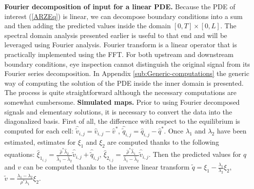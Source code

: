 \documentclass[preprint]{elsarticle}
\begin{document}
\textbf{Fourier decomposition of input for a linear PDE. } Because the PDE of interest (\eqref{ARZEq}) is linear, we can decompose boundary conditions into a sum and then adding
the predicted values inside the domain $\left[0,T\right]\times\left[0,L\right]$. The spectral domain analysis presented
earlier is useful to that end and will be leveraged using Fourier
analysis. Fourier transform is a linear operator that is practically
implemented using the FFT.
For both upstream and downstream boundary conditions,
eye inspection cannot distinguish the original signal from its Fourier
series decomposition. In Appendix \ref{sub:Generic-computations}
the generic way of computing the solution of the PDE inside the inner
domain is presented. The process is quite straightforward although
the necessary computations are somewhat cumbersome. \textbf{Simulated maps.} Prior to using Fourier decomposed signals and elementary solutions,
it is necessary to convert the data into the diagonalized basis. First
of all, the difference with respect to the equilibrium is computed
for each cell: $\widehat{\widetilde{v}}_{i,j}=\widehat{v}_{i,j}-\widehat{v}^{*}$,
$\widehat{\widetilde{q}}_{i,j}=\widehat{q}_{i,j}-\widehat{q}^{*}$.
Once $\lambda_{1}$ and $\lambda_{2}$ have been estimated, estimates
for $\xi_{1}$ and $\xi_{2}$ are computed thanks to the following
equations: $\widehat{\xi}_{1_{i,j}}=\frac{\widehat{\rho}^{*}\widehat{\lambda}_{2}}{\widehat{\lambda}_{1}-\widehat{\lambda}_{2}}\widehat{\widetilde{v}}_{i,j}+\widehat{\widetilde{q}}_{i,j}$,
$\widehat{\xi}_{2_{i,j}}=\frac{\widehat{\rho}^{*}\widehat{\lambda}_{1}}{\widehat{\lambda}_{1}-\widehat{\lambda}_{2}}\widehat{\widetilde{v}}_{i,j}$.
Then the predicted values for $q$and $v$ can be computed thanks
to the inverse linear transform $\widetilde{q}=\xi_{1}-\frac{\lambda_{1}}{\lambda_{2}}\xi_{2}$,
$\widetilde{v}=\frac{\lambda_{1}-\lambda_{2}}{\rho^{*}\lambda_{1}}\xi_{2}$.
\end{document}
